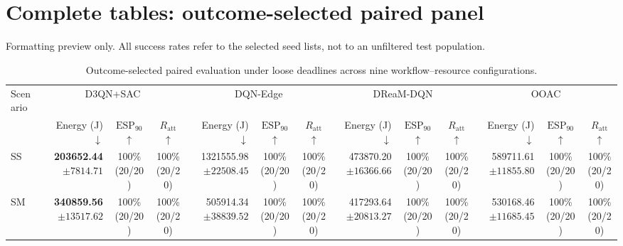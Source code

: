 \documentclass[10pt]{article}
\begin{document}
\section*{Complete tables: outcome-selected paired panel}
Formatting preview only. All success rates refer to the selected seed lists, not to an unfiltered test population.
\begin{table}[!htbp]
\centering
\caption{Outcome-selected paired evaluation under loose deadlines across nine workflow--resource configurations.}
\label{tab:conditional_full_loose}
\begingroup
\footnotesize
\setlength{\tabcolsep}{2.2pt}
\renewcommand{\arraystretch}{1.08}
\begin{tabular}{@{}l*{4}{rcc}@{}}
\toprule
Scenario & \multicolumn{3}{c}{D3QN+SAC} & \multicolumn{3}{c}{DQN-Edge} & \multicolumn{3}{c}{DReaM-DQN} & \multicolumn{3}{c}{OOAC} \\
\cmidrule(lr){2-4}\cmidrule(lr){5-7}\cmidrule(lr){8-10}\cmidrule(lr){11-13}
 & Energy (J) $\downarrow$ & $\mathrm{ESP}_{90}$ $\uparrow$ & $R_{\mathrm{att}}$ $\uparrow$ & Energy (J) $\downarrow$ & $\mathrm{ESP}_{90}$ $\uparrow$ & $R_{\mathrm{att}}$ $\uparrow$ & Energy (J) $\downarrow$ & $\mathrm{ESP}_{90}$ $\uparrow$ & $R_{\mathrm{att}}$ $\uparrow$ & Energy (J) $\downarrow$ & $\mathrm{ESP}_{90}$ $\uparrow$ & $R_{\mathrm{att}}$ $\uparrow$ \\
\midrule
SS & \shortstack[r]{\textbf{203652.44}\\$\pm 7814.71$} & \shortstack[c]{100\%\\(20/20)} & \shortstack[c]{100\%\\(20/20)} & \shortstack[r]{1321555.98\\$\pm 22508.45$} & \shortstack[c]{100\%\\(20/20)} & \shortstack[c]{100\%\\(20/20)} & \shortstack[r]{473870.20\\$\pm 16366.66$} & \shortstack[c]{100\%\\(20/20)} & \shortstack[c]{100\%\\(20/20)} & \shortstack[r]{589711.61\\$\pm 11855.80$} & \shortstack[c]{100\%\\(20/20)} & \shortstack[c]{100\%\\(20/20)} \\
SM & \shortstack[r]{\textbf{340859.56}\\$\pm 13517.62$} & \shortstack[c]{100\%\\(20/20)} & \shortstack[c]{100\%\\(20/20)} & \shortstack[r]{505914.34\\$\pm 38839.52$} & \shortstack[c]{100\%\\(20/20)} & \shortstack[c]{100\%\\(20/20)} & \shortstack[r]{417293.64\\$\pm 20813.27$} & \shortstack[c]{100\%\\(20/20)} & \shortstack[c]{100\%\\(20/20)} & \shortstack[r]{530168.46\\$\pm 11685.45$} & \shortstack[c]{100\%\\(20/20)} & \shortstack[c]{100\%\\(20/20)} \\

\end{tabular}
\end{table}
\end{document}
